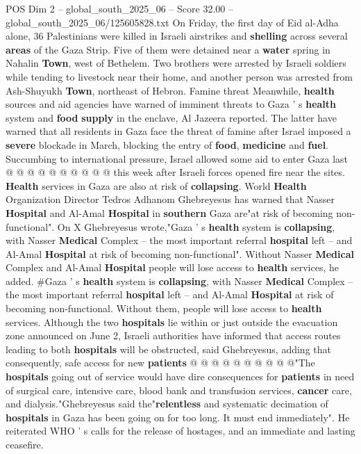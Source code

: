 \begin{textsample}{POS Dim 2 – global\_south\_2025\_06 – Score 32.00 – global\_south\_2025\_06/125605828.txt}
On Friday, the first day of Eid al-Adha alone, 36 Palestinians were killed in Israeli airstrikes and \textbf{shelling} across several \textbf{areas} of the Gaza Strip.
Five of them were detained near a \textbf{water} spring in Nahalin \textbf{Town}, west of Bethelem.
Two brothers were arrested by Israeli soldiers while tending to livestock near their home, and another person was arrested from Ash-Shuyukh \textbf{Town}, northeast of Hebron.
Famine threat Meanwhile, \textbf{health} sources and aid agencies have warned of imminent threats to Gaza ' s \textbf{health} system and \textbf{food} \textbf{supply} in the enclave, Al Jazeera reported.
The latter have warned that all residents in Gaza face the threat of famine after Israel imposed a \textbf{severe} blockade in March, blocking the entry of \textbf{food}, \textbf{medicine} and \textbf{fuel}.
Succumbing to international pressure, Israel allowed some aid to enter Gaza last @ @ @ @ @ @ @ @ @ @ this week after Israeli forces opened fire near the sites. \textbf{Health} services in Gaza are also at risk of \textbf{collapsing}.
World \textbf{Health} Organization Director Tedros Adhanom Ghebreyesus has warned that Nasser \textbf{Hospital} and Al-Amal \textbf{Hospital} in \textbf{southern} Gaza are"at risk of becoming non-functional".
On X Ghebreyesus wrote,"Gaza ' s \textbf{health} system is \textbf{collapsing}, with Nasser \textbf{Medical} Complex -- the most important referral \textbf{hospital} left -- and Al-Amal \textbf{Hospital} at risk of becoming non-functional".
Without Nasser \textbf{Medical} Complex and Al-Amal \textbf{Hospital} people will lose access to \textbf{health} services, he added. \#Gaza ' s \textbf{health} system is \textbf{collapsing}, with Nasser \textbf{Medical} Complex -- the most important referral \textbf{hospital} left -- and Al-Amal \textbf{Hospital} at risk of becoming non-functional.
Without them, people will lose access to \textbf{health} services.
Although the two \textbf{hospitals} lie within or just outside the evacuation zone announced on June 2, Israeli authorities have informed that access routes leading to both \textbf{hospitals} will be obstructed, said Ghebreyesus, adding that consequently, safe access for new \textbf{patients} @ @ @ @ @ @ @ @ @ @"The \textbf{hospitals} going out of service would have dire consequences for \textbf{patients} in need of surgical care, intensive care, blood bank and transfusion services, \textbf{cancer} care, and dialysis."Ghebreyesus said the"\textbf{relentless} and systematic decimation of \textbf{hospitals} in Gaza has been going on for too long.
It must end immediately".
He reiterated WHO ' s calls for the release of hostages, and an immediate and lasting ceasefire.

\end{textsample}
